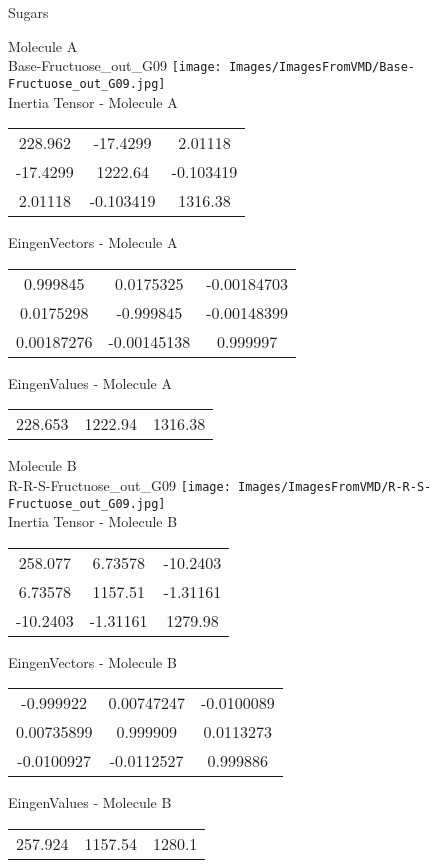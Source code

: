 \vtab[-2cm]
\begin{center}
{\large Sugars}
\end{center}
\begin{multicols}{2}
\begin{center}
Molecule A \\ 
Base-Fructuose\_out\_G09
\texttt{[image: Images/ImagesFromVMD/Base-Fructuose\_out\_G09.jpg]}
\\
Inertia Tensor - Molecule A \\
\vtab
\begin{tabular}{|c c c|}
228.962	 & 	-17.4299	 & 	2.01118	 \\
-17.4299	 & 	1222.64	 & 	-0.103419	 \\
2.01118	 & 	-0.103419	 & 	1316.38
\end{tabular}

\vtab
 EingenVectors - Molecule A     \\
\vtab
\begin{tabular}{|c c c|}
0.999845	 & 	0.0175325	 & 	-0.00184703	 \\
0.0175298	 & 	-0.999845	 & 	-0.00148399	 \\
0.00187276	 & 	-0.00145138	 & 	0.999997
\end{tabular}

\vtab
 EingenValues - Molecule A     \\
\vtab
\begin{tabular}{|c c c|}
228.653	 & 	1222.94	 & 	1316.38
\end{tabular}
\columnbreak

Molecule B \\ 
R-R-S-Fructuose\_out\_G09
\texttt{[image: Images/ImagesFromVMD/R-R-S-Fructuose\_out\_G09.jpg]}
\\
Inertia Tensor - Molecule B \\
\vtab
\begin{tabular}{|c c c|}
258.077	 & 	6.73578	 & 	-10.2403	 \\
6.73578	 & 	1157.51	 & 	-1.31161	 \\
-10.2403	 & 	-1.31161	 & 	1279.98
\end{tabular}

\vtab
 EingenVectors - Molecule B     \\
\vtab
\begin{tabular}{|c c c|}
-0.999922	 & 	0.00747247	 & 	-0.0100089	 \\
0.00735899	 & 	0.999909	 & 	0.0113273	 \\
-0.0100927	 & 	-0.0112527	 & 	0.999886
\end{tabular}

\vtab
 EingenValues - Molecule B     \\
\vtab
\begin{tabular}{|c c c|}
257.924	 & 	1157.54	 & 	1280.1
\end{tabular}

\end{center}
\end{multicols}
